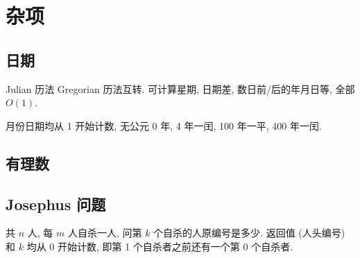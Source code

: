 \section{杂项}
\subsection{日期}
Julian 历法 Gregorian 历法互转. 可计算星期, 日期差, 数日前/后的年月日等, 全部 $O(1)$.

月份日期均从 1 开始计数, 无公元 0 年, 4 年一闰, 100 年一平, 400 年一闰.



\subsection{有理数}


\subsection{Josephus 问题}
共 $n$ 人, 每 $m$ 人自杀一人, 问第 $k$ 个自杀的人原编号是多少. 返回值 (人头编号) 和 $k$ 均从 0 开始计数, 即第 1 个自杀者之前还有一个第 0 个自杀者.


